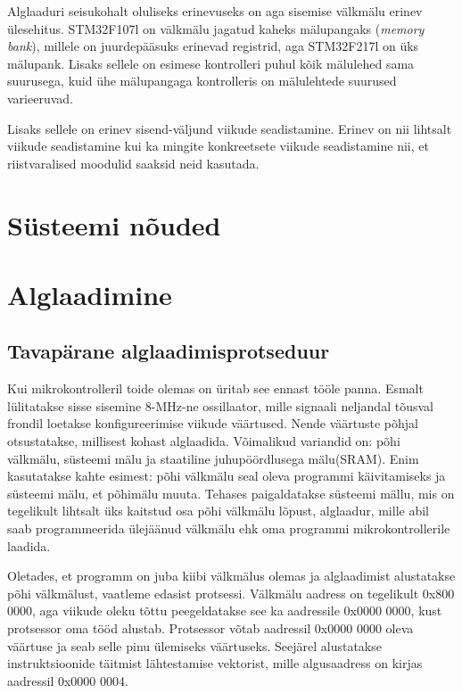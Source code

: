 \documentclass[12pt,a4paper]{article}
\begin{document}
Alglaaduri seisukohalt oluliseks erinevuseks on aga sisemise välkmälu erinev
ülesehitus. STM32F107l on välkmälu jagatud kaheks mälupangaks (\textit{memory
bank}), millele on juurdepääsuks erinevad registrid, aga STM32F217l on üks
mälupank. Lisaks sellele on esimese kontrolleri puhul kõik mälulehed sama
suurusega, kuid ühe mälupangaga kontrolleris on mälulehtede suurused
varieeruvad. \cite{f1fpm,f2fpm}

Lisaks sellele on erinev sisend-väljund viikude seadistamine. Erinev on nii
lihtsalt viikude seadistamine kui ka mingite konkreetsete viikude seadistamine
nii, et riistvaralised moodulid saaksid neid kasutada.

\section{Süsteemi nõuded}

\section{Alglaadimine}
\label{sec:boot}
\subsection{Tavapärane alglaadimisprotseduur}
Kui mikrokontrolleril toide olemas on üritab see ennast tööle panna.
Esmalt lülitatakse sisse sisemine 8-MHz-ne ossillaator, mille signaali
neljandal tõusval frondil loetakse konfigureerimise viikude väärtused. Nende
väärtuste põhjal otsustatakse, millisest kohast alglaadida. Võimalikud
variandid on: põhi välkmälu, süsteemi mälu ja staatiline juhupöördlusega
mälu(SRAM).  Enim kasutatakse kahte esimest: põhi välkmälu seal oleva programmi
käivitamiseks ja süsteemi mälu, et põhimälu muuta. Tehases paigaldatakse
süsteemi mällu, mis on tegelikult lihtsalt üks kaitstud osa põhi välkmälu
lõpust, alglaadur, mille abil saab programmeerida ülejäänud välkmälu ehk oma
programmi mikrokontrollerile laadida.

Oletades, et programm on juba kiibi välkmälus olemas ja alglaadimist
alustatakse põhi välkmälust, vaatleme edasist protsessi. Välkmälu aadress on
tegelikult 0x800 0000, aga viikude oleku tõttu peegeldatakse see ka aadressile
0x0000 0000, kust protsessor oma tööd alustab.  Protsessor võtab aadressil
0x0000 0000 oleva väärtuse ja seab selle pinu ülemiseks väärtuseks. Seejärel
alustatakse instruktsioonide täitmist lähtestamise vektorist, mille
algusaadress on kirjas aadressil 0x0000 0004. \cite{f1rm}
\end{document}
